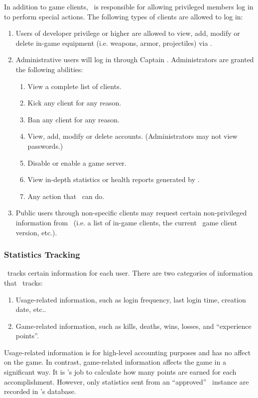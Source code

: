 In addition to game clients, \MainServer\ is responsible for allowing privileged members log in to perform special actions. The following types of clients are allowed to log in:
\begin{enumerate}
\item Users of developer privilege or higher are allowed to view, add, modify or delete in-game equipment (i.e. weapons, armor, projectiles) via \Janitor.
\item Administrative users will log in through Captain \VTank. Administrators are granted the following abilities:
	\begin{enumerate}
	\item View a complete list of clients.
	\item Kick any client for any reason.
	\item Ban any client for any reason.
	\item View, add, modify or delete accounts. (Administrators may not view passwords.)
	\item Disable or enable a game server.
	\item View in-depth statistics or health reports generated by \MainServer.
	\item Any action that \Janitor\ can do.
	\end{enumerate}
\item Public users through non-specific clients may request certain non-privileged information from \MainServer\ (i.e. a list of in-game clients, the current \VTank\ game client version, etc.).
\end{enumerate}

\subsubsection*{Statistics Tracking}

\MainServer\ tracks certain information for each user. There are two categories of information that \MainServer\ tracks:
\begin{enumerate}
	\item Usage-related information, such as login frequency, last login time, creation date, etc..
	\item Game-related information, such as kills, deaths, wins, losses, and ``experience points''.
\end{enumerate}
Usage-related information is for high-level accounting purposes and has no affect on the game. In contrast, game-related information affects the game in a significant way. It is \GameServer's job to calculate how many points are earned for each accomplishment. However, only statistics sent from an ``approved'' \GameServer\ instance are recorded in \MainServer's database.


